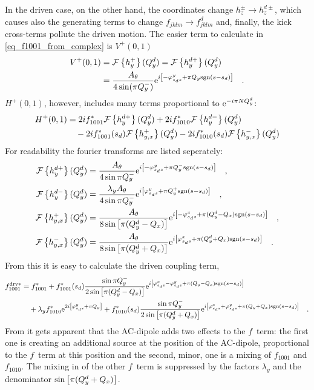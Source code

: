 %
In the driven case, on the other hand, the coordinates change $h_z^\pm \rightarrow h_z^{d\pm}$, which
causes also the generating terms to change $f_{jklm} \rightarrow f^d_{jklm}$ and, finally, the kick
cross-terms pollute the driven motion.
The easier term to calculate in \eqref{eq_f1001_from_complex} is $V^+(0,1)$
%
\begin{align}
    V^+(0,1) &= \mathcal{F} \left\{ h_y^+ \right\}(Q_y^d) = \mathcal{F} \left\{ h_y^{d+} \right\}(Q_y^d)
    \notag \\
    &= \frac{A_\theta}{4\sin(\pi Q_y^-)}
        \text{e}^{i\left[-\varphi_{s_ds}^{y} + \pi Q_y\text{sgn}(s-s_d)\right]}
        \quad .
\end{align}
%
$H^+(0,1)$, however, includes many terms proportional to $\text{e}^{-i\pi N Q_y^d}$:
%
\begin{align}
   H^+(0,1) &=
    2i f_{1001}^*      \mathcal{F} \left\{ h_y^{d+} \right\}(Q_y^d)
   +2i f_{1010}^*      \mathcal{F} \left\{ h_y^{d-} \right\}(Q_y^d)
   \notag \\&\quad
   -2i f_{1001}^*(s_d) \mathcal{F} \left\{ h_{y,x}^{+} \right\}(Q_y^d)
   -2i f_{1010}^*(s_d) \mathcal{F} \left\{ h_{y,x}^{-} \right\}(Q_y^d)
\end{align}
%
For readability the fourier transforms are listed seperately:
%
\begin{align}
    \mathcal{F} \left\{ h_y^{d+} \right\}(Q_y^d) &= \frac{A_\theta}{4\sin\pi Q_y^-}
        \text{e}^{i\left[-\varphi_{s_ds}^{y} + \pi Q_y^-\text{sgn}(s-s_d)\right]}
    \quad ,
    \notag \\
    \mathcal{F} \left\{ h_y^{d-} \right\}(Q_y^d) &= \frac{\lambda_y A_\theta}{4\sin\pi Q_y^-}
        \text{e}^{i\left[\varphi_{s_ds}^{y} + \pi Q_y^+\text{sgn}(s-s_d)\right]}
    \quad ,
    \notag \\
    \mathcal{F} \left\{ h_{y,x}^{+} \right\}(Q_y^d) &= \frac{A_\theta}{8\sin\left[\pi (Q_y^d - Q_x)\right]}
        \text{e}^{i\left[-\varphi_{s_ds}^{x} + \pi (Q_y^d - Q_x)\text{sgn}(s-s_d)\right]}
    \quad ,
    \notag \\
    \mathcal{F} \left\{ h_{y,x}^{-} \right\}(Q_y^d) &= \frac{A_\theta}{8\sin\left[\pi (Q_y^d + Q_x)\right]}
        \text{e}^{i\left[\varphi_{s_ds}^{x} + \pi (Q_y^d + Q_x)\text{sgn}(s-s_d)\right]}
    \quad .
\end{align}
%
From this it is easy to calculate the driven coupling term,
%
\begin{align}
    f_{1001}^{\text{drv}*} &=
    f_{1001}^*
    + f_{1001}^*(s_d) \frac{\sin\pi Q_y^-}{2\sin\left[\pi (Q_y^d-Q_x)\right]}
        \text{e}^{i\left[\varphi_{s_ds}^{x} -\varphi_{s_ds}^{y} + \pi(Q_y-Q_x)\text{sgn}(s-s_d)\right]}
        \notag \\
    &\quad
    + \lambda_y f_{1010}^*\text{e}^{2i\left[ \varphi_{s_ds}^{y} + \pi Q_y\right]}
    + f_{1010}^*(s_d) \frac{\sin\pi Q_y^-}{2\sin\left[\pi (Q_y^d+Q_x)\right]}
        \text{e}^{i\left[\varphi_{s_ds}^{x} + \varphi_{s_ds}^{y} + \pi(Q_y+Q_x)\text{sgn}(s-s_d)\right]}
        \quad .
    \label{eq_drv_f1001_final}
\end{align}
%
From  it gets apparent that the AC-dipole adds two effects to the $f$~term:
the first one is creating an additional source at the position of the AC-dipole, proportional to the $f$~term
at this position
and the second, minor, one is a mixing of $f_{1001}$ and $f_{1010}$. The mixing in of the other $f$~term is
suppressed by the factors $\lambda_{y}$ and the denominator $\sin\left[\pi (Q^{d}_{y} + Q_x)\right]$.

